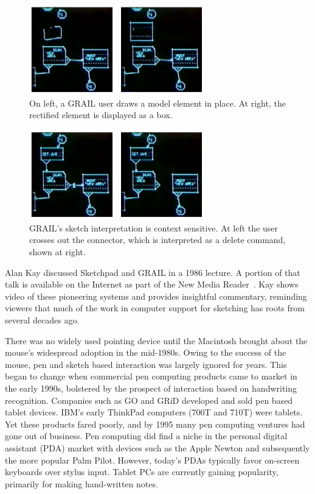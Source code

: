 \begin{samepage}
\begin{figure}
\begin{center}
  \includegraphics[angle=0, origin=c, width=3.0in]{img/grail-box.pdf} 
  \caption{On left, a GRAIL user draws a model element in place. At
  right, the rectified element is displayed as a box.}
\label{fig:grail-box}
\end{center}
\end{figure}
\begin{figure}
\begin{center}
  \includegraphics[angle=0, origin=c, width=3.0in]{img/grail-gesture.pdf}
  \caption{GRAIL's sketch interpretation is context sensitive. At left
  the user crosses out the connector, which is interpreted as a delete
  command, shown at right.}
\label{fig:grail-gesture}
\end{center}
\end{figure}
\end{samepage}

Alan Kay discussed Sketchpad and GRAIL in a 1986 lecture. A portion of
that talk is available on the Internet as part of the New Media
Reader~\cite{kay-sketchpad-grail-dynabook,nmr}. Kay shows video of
these pioneering systems and provides insightful commentary, reminding
viewers that much of the work in computer support for sketching has
roots from several decades ago.

There was no widely used pointing device until the Macintosh brought
about the mouse's widespread adoption in the mid-1980s. Owing to the
success of the mouse, pen and sketch based interaction was largely
ignored for years. This began to change when commercial pen computing
products came to market in the early 1990s, bolstered by the prospect
of interaction based on handwriting recognition. Companies such as GO
and GRiD developed and sold pen based tablet devices. IBM's early
ThinkPad computers (700T and 710T) were tablets. Yet these products
fared poorly, and by 1995 many pen computing ventures had gone out of
business. Pen computing did find a niche in the personal digital
assistant (PDA) market with devices such as the Apple Newton and
subsequently the more popular Palm Pilot. However, today's PDAs
typically favor on-screen keyboards over stylus input. Tablet PCs are
currently gaining popularity, primarily for making hand-written notes.

